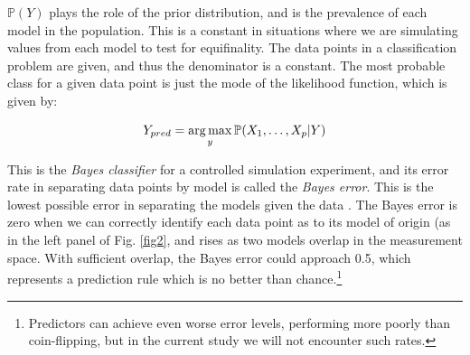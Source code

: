 \(\mathbb{P}(Y)\) plays the role of the prior distribution, and is the
prevalence of each model in the population. This is a constant in
situations where we are simulating values from each model to test for
equifinality. The data points in a classification problem are given, and
thus the denominator is a constant. The most probable class for a given
data point is just the mode of the likelihood function, which is given
by:

\begin{equation}
Y_{pred} = \operatorname*{arg\,max}_y \mathbb{P}(X_1, \ldots, X_p | Y)
\label{eq:map-class-bayes}
\end{equation}

This is the \emph{Bayes classifier} for a controlled simulation
experiment, and its error rate in separating data points by model is
called the \emph{Bayes error}. This is the lowest possible error in
separating the models given the data
\cite{devijver1982pattern, fukunaga1990introduction, hastie2009elements}.
The Bayes error is zero when we can correctly identify each data point
as to its model of origin (as in the left panel of Fig. \ref{fig2}, and rises as two models overlap in the
measurement space. With sufficient overlap, the Bayes error could
approach 0.5, which represents a prediction rule which is no better than
chance.\footnote{Predictors can achieve even worse error levels, performing more poorly than coin-flipping, but in the current study we will not encounter such rates.}

